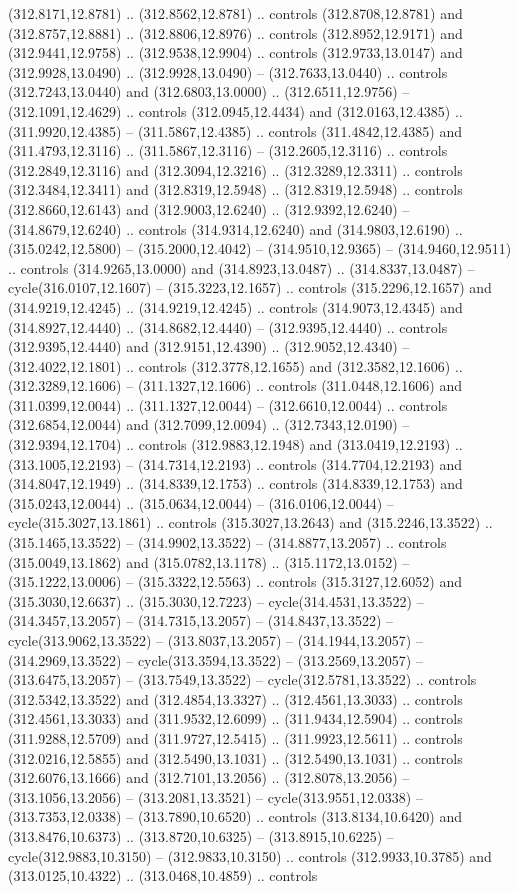 (312.8171,12.8781) .. (312.8562,12.8781) .. controls (312.8708,12.8781) and (312.8757,12.8881) .. (312.8806,12.8976) .. controls (312.8952,12.9171) and (312.9441,12.9758) .. (312.9538,12.9904) .. controls (312.9733,13.0147) and (312.9928,13.0490) .. (312.9928,13.0490) -- (312.7633,13.0440) .. controls (312.7243,13.0440) and (312.6803,13.0000) .. (312.6511,12.9756) -- (312.1091,12.4629) .. controls (312.0945,12.4434) and (312.0163,12.4385) .. (311.9920,12.4385) -- (311.5867,12.4385) .. controls (311.4842,12.4385) and (311.4793,12.3116) .. (311.5867,12.3116) -- (312.2605,12.3116) .. controls (312.2849,12.3116) and (312.3094,12.3216) .. (312.3289,12.3311) .. controls (312.3484,12.3411) and (312.8319,12.5948) .. (312.8319,12.5948) .. controls (312.8660,12.6143) and (312.9003,12.6240) .. (312.9392,12.6240) -- (314.8679,12.6240) .. controls (314.9314,12.6240) and (314.9803,12.6190) .. (315.0242,12.5800) -- (315.2000,12.4042) -- (314.9510,12.9365) -- (314.9460,12.9511) .. controls (314.9265,13.0000) and (314.8923,13.0487) .. (314.8337,13.0487) -- cycle(316.0107,12.1607) -- (315.3223,12.1657) .. controls (315.2296,12.1657) and (314.9219,12.4245) .. (314.9219,12.4245) .. controls (314.9073,12.4345) and (314.8927,12.4440) .. (314.8682,12.4440) -- (312.9395,12.4440) .. controls (312.9395,12.4440) and (312.9151,12.4390) .. (312.9052,12.4340) -- (312.4022,12.1801) .. controls (312.3778,12.1655) and (312.3582,12.1606) .. (312.3289,12.1606) -- (311.1327,12.1606) .. controls (311.0448,12.1606) and (311.0399,12.0044) .. (311.1327,12.0044) -- (312.6610,12.0044) .. controls (312.6854,12.0044) and (312.7099,12.0094) .. (312.7343,12.0190) -- (312.9394,12.1704) .. controls (312.9883,12.1948) and (313.0419,12.2193) .. (313.1005,12.2193) -- (314.7314,12.2193) .. controls (314.7704,12.2193) and (314.8047,12.1949) .. (314.8339,12.1753) .. controls (314.8339,12.1753) and (315.0243,12.0044) .. (315.0634,12.0044) -- (316.0106,12.0044) -- cycle(315.3027,13.1861) .. controls (315.3027,13.2643) and (315.2246,13.3522) .. (315.1465,13.3522) -- (314.9902,13.3522) -- (314.8877,13.2057) .. controls (315.0049,13.1862) and (315.0782,13.1178) .. (315.1172,13.0152) -- (315.1222,13.0006) -- (315.3322,12.5563) .. controls (315.3127,12.6052) and (315.3030,12.6637) .. (315.3030,12.7223) -- cycle(314.4531,13.3522) -- (314.3457,13.2057) -- (314.7315,13.2057) -- (314.8437,13.3522) -- cycle(313.9062,13.3522) -- (313.8037,13.2057) -- (314.1944,13.2057) -- (314.2969,13.3522) -- cycle(313.3594,13.3522) -- (313.2569,13.2057) -- (313.6475,13.2057) -- (313.7549,13.3522) -- cycle(312.5781,13.3522) .. controls (312.5342,13.3522) and (312.4854,13.3327) .. (312.4561,13.3033) .. controls (312.4561,13.3033) and (311.9532,12.6099) .. (311.9434,12.5904) .. controls (311.9288,12.5709) and (311.9727,12.5415) .. (311.9923,12.5611) .. controls (312.0216,12.5855) and (312.5490,13.1031) .. (312.5490,13.1031) .. controls (312.6076,13.1666) and (312.7101,13.2056) .. (312.8078,13.2056) -- (313.1056,13.2056) -- (313.2081,13.3521) -- cycle(313.9551,12.0338) -- (313.7353,12.0338) -- (313.7890,10.6520) .. controls (313.8134,10.6420) and (313.8476,10.6373) .. (313.8720,10.6325) -- (313.8915,10.6225) -- cycle(312.9883,10.3150) -- (312.9833,10.3150) .. controls (312.9933,10.3785) and (313.0125,10.4322) .. (313.0468,10.4859) .. controls 